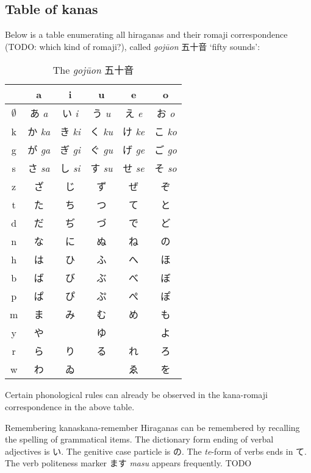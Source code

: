 \documentclass[UTF8, a4paper, oneside, scheme=plain]{ctexrep}
\newcommand{\corpus}[1]{\emph{#1}}
\newcommand{\translate}[1]{`#1'}
\begin{document}
\subsection{Table of kanas}\label{sec:kana}

Below is a table enumerating all hiraganas and their romaji correspondence (TODO: which kind of romaji?), 
called \corpus{gojūon} 五十音 \translate{fifty sounds}:
\begin{table}[H]
    \caption{The \corpus{gojūon} 五十音}
    \label{tbl:hiragana-chart}
    \centering
    \begin{tabular}{cccccc}
        \toprule
         & a & i & u & e & o \\ 
        \midrule
        $\emptyset$ & あ \corpus{a} & い \corpus{i} & う \corpus{u} & え \corpus{e} & お \corpus{o} \\ 
        k & か \corpus{ka} & き \corpus{ki} & く \corpus{ku} & け \corpus{ke} & こ \corpus{ko} \\ 
        g & が \corpus{ga} & ぎ \corpus{gi} & ぐ \corpus{gu} & げ \corpus{ge} & ご \corpus{go} \\ 
        s & さ \corpus{sa} & し \corpus{si} & す \corpus{su} & せ \corpus{se} & そ \corpus{so} \\ 
        z & ざ & じ & ず & ぜ & ぞ \\ 
        t & た & ち & つ & て & と \\ 
        d & だ & ぢ & づ & で & ど \\ 
        n & な & に & ぬ & ね & の \\ 
        h & は & ひ & ふ & へ & ほ \\ 
        b & ば & び & ぶ & べ & ぼ \\ 
        p & ぱ & ぴ & ぷ & ぺ & ぽ \\ 
        m & ま & み & む & め & も \\ 
        y & や & ~ & ゆ & ~ & よ \\ 
        r & ら & り & る & れ & ろ \\ 
        w & わ & ゐ & ~ & ゑ & を \\ 
        \bottomrule
    \end{tabular}
\end{table}

Certain phonological rules can already be observed in the kana-romaji correspondence in the above table.

\begin{learnbox}{Remembering kanas}{kana-remember}
    Hiraganas can be remembered by recalling the spelling of grammatical items.
    The dictionary form ending of verbal adjectives is い.
    The genitive case particle is の.
    The \corpus{te}-form of verbs ends in て.
    The verb politeness marker ます \corpus{masu} appears frequently.
    TODO
\end{learnbox}
\end{document}
